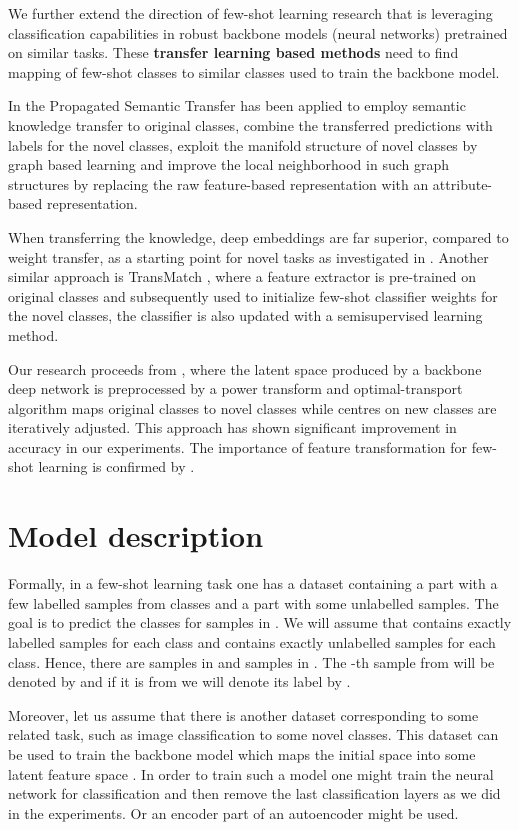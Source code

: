 \documentclass[letterpaper]{article} \usepackage{aaai20}  \usepackage{times}  \usepackage{helvet} \usepackage{courier}  \usepackage[hyphens]{url}  \usepackage{graphicx} \urlstyle{rm} \def\UrlFont{\rm}  \usepackage{graphicx}  \frenchspacing  \setlength{\pdfpagewidth}{8.5in}  \setlength{\pdfpageheight}{11in}  \usepackage[ruled,vlined]{algorithm2e}
\begin{document}
We further extend the direction of few-shot learning research that is leveraging classification capabilities in robust backbone models (neural networks) pretrained on similar tasks. These {\bf transfer learning based methods} need to find mapping of few-shot classes to similar classes used to train the backbone model. 

In \cite{rohrbach2013transfer} the Propagated Semantic Transfer has been applied to employ semantic knowledge transfer to original classes, combine the transferred predictions with labels for the novel classes, exploit the manifold structure of novel classes by graph based learning and improve the local neighborhood in such graph structures by replacing the raw feature-based representation with an attribute-based representation. 

When transferring the knowledge, deep embeddings are far superior, compared to weight transfer, as a starting point for novel tasks as investigated in \cite{scott2018adapted}. Another similar approach is TransMatch \cite{yu2020transmatch}, where a feature extractor is pre-trained on original classes and subsequently used to initialize few-shot classifier weights for the novel classes, the classifier is also updated with a semisupervised learning method. 

Our research proceeds from \cite{hu2020leveraging}, where the latent space produced by a backbone deep network is preprocessed by a power transform and optimal-transport algorithm maps original classes to novel classes while centres on new classes are iteratively adjusted. This approach has shown significant improvement in accuracy in our experiments. The importance of feature transformation for few-shot learning is confirmed by \cite{wang2019simpleshot}. 

\section{Model description}
Formally, in a few-shot learning task one has a dataset  containing a part  with a few labelled samples from  classes and 
a part  with some unlabelled samples.
The goal is to predict the classes for samples in . We will assume that  contains exactly  labelled samples for each class and  contains 
exactly  unlabelled samples for each class. Hence, there are  samples in  and  samples in . The -th sample from  will be denoted by 
 and if it is from  we will denote its label by .

Moreover, let us assume that there is another dataset  corresponding to some related task, such as image classification to some novel classes.
This dataset can be used to train the backbone model  which maps the initial space into some latent feature space . 
In order to train such a model one might train the neural network for classification and then remove the last classification layers as we did in the experiments. 
Or an encoder part of an autoencoder might be used. 
\end{document}
